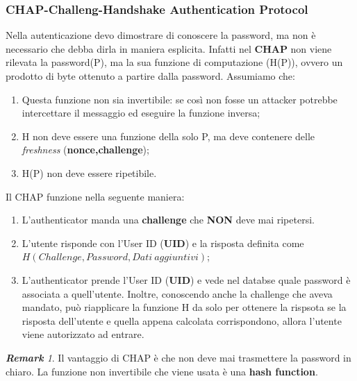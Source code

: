 \documentclass{article}
\theoremstyle{remark}
\newtheorem*{remark}{\textbf{Remark}}
\begin{document}
\subsubsection{CHAP-Challeng-Handshake Authentication Protocol}
Nella autenticazione devo dimostrare di conoscere la password, ma non è necessario che debba dirla in maniera esplicita. Infatti nel \textbf{CHAP} non viene rilevata la password(P), ma la sua funzione di computazione (H(P)), ovvero un prodotto di byte ottenuto a partire dalla password. Assumiamo che:\begin{enumerate}
	\item Questa funzione non sia invertibile: se così non fosse un attacker potrebbe intercettare il messaggio ed eseguire la funzione inversa;
	\item H non deve essere una funzione della solo P, ma deve contenere delle \emph{freshness} (\textbf{nonce,challenge});
	\item H(P) non deve essere ripetibile.
\end{enumerate}
Il CHAP funzione nella seguente maniera:\begin{enumerate}
	\item L'authenticator manda una \textbf{challenge} che \textbf{NON} deve mai ripetersi.
	\item L'utente risponde con l'User ID (\textbf{UID}) e la risposta definita come $H(Challenge,Password,Dati\ aggiuntivi)$;
	\item L'authenticator prende l'User ID (\textbf{UID}) e vede nel databse quale password è associata a quell'utente. Inoltre, conoscendo anche la challenge che aveva mandato, può riapplicare la funzione H da solo per ottenere la rispsota se la risposta dell'utente e quella appena calcolata corrispondono, allora l'utente viene autorizzato ad entrare.
\end{enumerate}
\begin{remark}
	Il vantaggio di CHAP è che non deve mai trasmettere la password in chiaro. La funzione non invertibile che viene usata è una \textbf{hash function}.
\end{remark}
\end{document}
